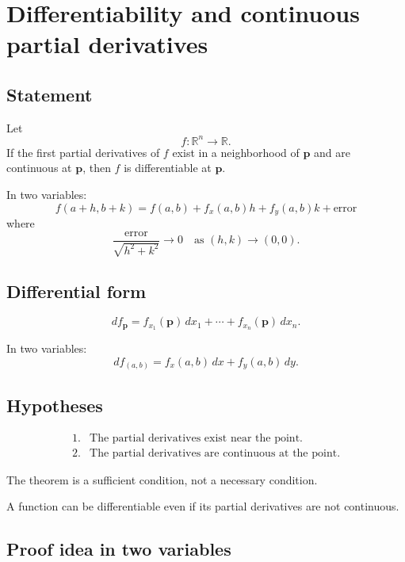 \section{Differentiability and continuous partial derivatives}
\label{app:F.1}

\subsection*{Statement}

Let
\[
    f:\mathbb R^n\to\mathbb R.
\]
If the first partial derivatives of \(f\) exist in a neighborhood of \(\mathbf p\) and are
continuous at \(\mathbf p\), then \(f\) is differentiable at \(\mathbf p\).

In two variables:
\[
\boxed{
    f(a+h,b+k)
    =
    f(a,b)
    +
    f_x(a,b)h
    +
    f_y(a,b)k
    +
    \text{error}
}
\]
where
\[
\boxed{
    \frac{\text{error}}{\sqrt{h^2+k^2}}\to0
    \quad\text{as }(h,k)\to(0,0).
}
\]

\subsection*{Differential form}

\[
\boxed{
    df_{\mathbf p}
    =
    f_{x_1}(\mathbf p)\,dx_1+\cdots+f_{x_n}(\mathbf p)\,dx_n.
}
\]

In two variables:
\[
\boxed{
    df_{(a,b)}=f_x(a,b)\,dx+f_y(a,b)\,dy.
}
\]

\subsection*{Hypotheses}

\[
\begin{array}{ll}
1. & \text{The partial derivatives exist near the point.}\\[1mm]
2. & \text{The partial derivatives are continuous at the point.}
\end{array}
\]

The theorem is a sufficient condition, not a necessary condition.

A function can be differentiable even if its partial derivatives are not continuous.

\subsection*{Proof idea in two variables}

